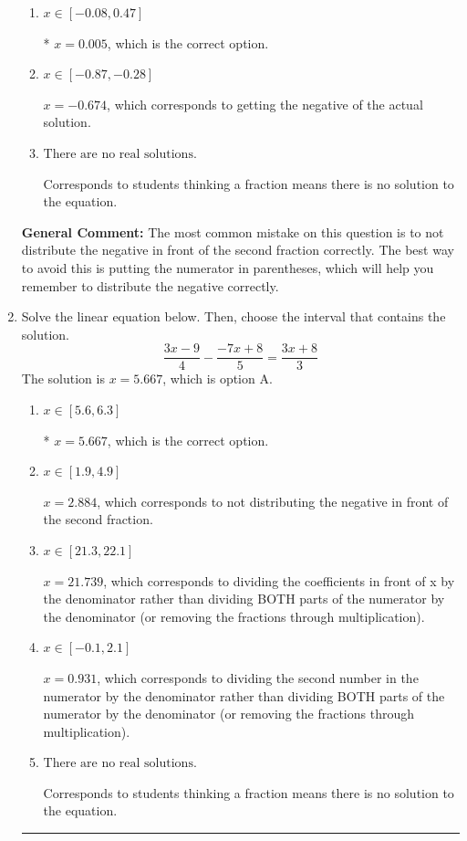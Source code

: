 \documentclass{extbook}[14pt]
\newcommand{\litem}[1]{\item #1

\rule{\textwidth}{0.4pt}}
\begin{document}
\begin{enumerate}
{\begin{enumerate}[label=\Alph*.]
$x = 1.136$, which corresponds to not distributing the negative in front of the second parentheses correctly.
\item \( x \in [-0.08, 0.47] \)

* $x = 0.005$, which is the correct option.
\item \( x \in [-0.87, -0.28] \)

$x = -0.674$, which corresponds to getting the negative of the actual solution.
\item \( \text{There are no real solutions.} \)

Corresponds to students thinking a fraction means there is no solution to the equation.
\end{enumerate}

\textbf{General Comment:} The most common mistake on this question is to not distribute the negative in front of the second fraction correctly. The best way to avoid this is putting the numerator in parentheses, which will help you remember to distribute the negative correctly.
}
\litem{
Solve the linear equation below. Then, choose the interval that contains the solution.
\[ \frac{3x -9}{4} - \frac{-7x + 8}{5} = \frac{3x + 8}{3} \]The solution is \( x = 5.667 \), which is option A.\begin{enumerate}[label=\Alph*.]
\item \( x \in [5.6, 6.3] \)

* $x = 5.667$, which is the correct option.
\item \( x \in [1.9, 4.9] \)

 $x = 2.884$, which corresponds to not distributing the negative in front of the second fraction.
\item \( x \in [21.3, 22.1] \)

 $x = 21.739$, which corresponds to dividing the coefficients in front of x by the denominator rather than dividing BOTH parts of the numerator by the denominator (or removing the fractions through multiplication).
\item \( x \in [-0.1, 2.1] \)

 $x = 0.931$, which corresponds to dividing the second number in the numerator by the denominator rather than dividing BOTH parts of the numerator by the denominator (or removing the fractions through multiplication).
\item \( \text{There are no real solutions.} \)

Corresponds to students thinking a fraction means there is no solution to the equation.
\end{enumerate}

}
\end{enumerate}
\end{document}
